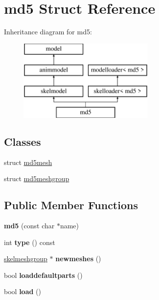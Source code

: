 \hypertarget{structmd5}{}\section{md5 Struct Reference}
\label{structmd5}
Inheritance diagram for md5\+:\begin{figure}[H]
\begin{center}
\leavevmode
\includegraphics[height=4.000000cm]{structmd5}
\end{center}
\end{figure}
\subsection*{Classes}
\begin{DoxyCompactItemize}
\item 
struct \hyperlink{structmd5_1_1md5mesh}{md5mesh}
\item 
struct \hyperlink{structmd5_1_1md5meshgroup}{md5meshgroup}
\end{DoxyCompactItemize}
\subsection*{Public Member Functions}
\begin{DoxyCompactItemize}
\item 
\mbox{\label{structmd5_ab28cd736e773953f543ce2b0c1088dd2}} 
{\bfseries md5} (const char $\ast$name)
\item 
\mbox{\label{structmd5_ad71dee1b5cdf9cee0d9dfd4b8c7ba776}} 
int {\bfseries type} () const
\item 
\mbox{\label{structmd5_aff10b031ceaea0833db2161b4531981e}} 
\hyperlink{structskelmodel_1_1skelmeshgroup}{skelmeshgroup} $\ast$ {\bfseries newmeshes} ()
\item 
\mbox{\label{structmd5_ae2dc482343873a1335e43d94a3be43da}} 
bool {\bfseries loaddefaultparts} ()
\item 
\mbox{\label{structmd5_a39f7c2241a0f9fd43203059011958701}} 
bool {\bfseries load} ()
\end{DoxyCompactItemize}
